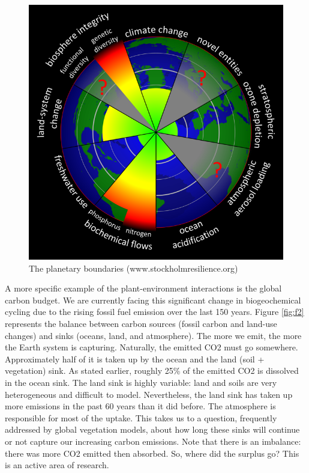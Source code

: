 \documentclass[
  12pt,
  oneside]{book}
\begin{document}
\begin{figure}

{\centering \includegraphics[width=0.6\linewidth]{figures/chap1/planetary_boundaries} 

}

\caption{The planetary boundaries (www.stockholmresilience.org)}\label{fig:f1}
\end{figure}

A more specific example of the plant-environment interactions is the global carbon budget. We are currently facing this significant change in biogeochemical cycling due to the rising fossil fuel emission over the last 150 years. Figure \ref{fig:f2} represents the balance between carbon sources (fossil carbon and land-use changes) and sinks (oceans, land, and atmosphere). The more we emit, the more the Earth system is capturing. Naturally, the emitted CO2 must go somewhere. Approximately half of it is taken up by the ocean and the land (soil + vegetation) sink. As stated earlier, roughly 25\% of the emitted CO2 is dissolved in the ocean sink. The land sink is highly variable: land and soils are very heterogeneous and difficult to model. Nevertheless, the land sink has taken up more emissions in the past 60 years than it did before. The atmosphere is responsible for most of the uptake. This takes us to a question, frequently addressed by global vegetation models, about how long these sinks will continue or not capture our increasing carbon emissions. Note that there is an imbalance: there was more CO2 emitted then absorbed. So, where did the surplus go? This is an active area of research.
\end{document}
